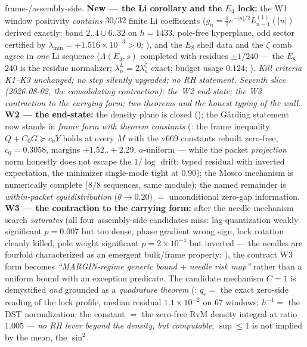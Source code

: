 \documentclass[11pt,a4paper]{article}
\begin{document}
frame-/assembly-side.  \textbf{New --- the Li corollary and the
$E_4$ lock:} the W1 window positivity \emph{contains} $30/32$ finite
Li coefficients ($g_n=\tfrac12e^{-|u|/2}L^{(1)}_{n-1}(|u|)$ derived
exactly; band $2..4\cup6..32$ on $h=1433$, pole-free hyperplane, odd
sector certified by $\lambda_{\min}=+1.516\times10^{-3}>0$;
), and the $E_8$ shell data and the
$\zeta$ comb agree in \emph{one} Li sequence ($\Lambda(E_4,s)$
completed with residues $\pm1/240$ --- the $E_8$ $240$ is the
residue normalizer; $\lambda_n^L=2\lambda_n^\zeta$ exact; budget
usage $0.124$; ).  \emph{Kill criteria K1--K3
unchanged; no step silently upgraded; no RH statement.}
\emph{Seventh slice (2026-08-02, the consolidating contraction): the
W2 end-state; the W3 contraction to the carrying form; two theorems
and the honest typing of the wall.}  \textbf{W2 --- the end-state:}
the density plane is closed (); the
G\aa rding statement now stands in \emph{frame form with theorem
constants} (: the frame inequality
$Q+C_0G\succeq c_0Y$ holds at every $M$ with the v669 constants
rebuilt zero-free, $c_0=0.3058$, margins $+1.52..+2.29$,
$a$-uniform --- while the packet \emph{projection} norm honestly
does not escape the $1/\log$ drift: typed residual with inverted
expectation, the minimizer single-mode tight at $0.90$); the Mosco
mechanism is numerically complete ($8/8$ sequences, same module);
the named remainder is \emph{within-packet equidistribution}
($\theta\to0.20$) $=$ unconditional zero-gap information.
\textbf{W3 --- the contraction to the carrying form:} after the
needle mechanism search \emph{saturates} (all four assembly-side
candidates miss: lag-quantization weakly significant $p=0.007$ but
too dense, phase gradient wrong sign, lock rotation cleanly killed,
pole weight significant $p=2\times10^{-4}$ but inverted --- the
needles are fourfold characterized as an emergent bulk/frame
property; ), the contract W3 form
becomes \emph{``MARGIN-regime generic bound $+$ needle risk map''}
rather than a uniform bound with an exception predicate.  The
candidate mechanism $C=1$ is demystified \emph{and} grounded as a
\emph{quadrature theorem} (: $q_r=$
the exact zero-side reading of the lock profile, median residual
$1.1\times10^{-2}$ on $67$ windows; $h^{-1}=$ the DST
normalization; the constant $=$ the zero-free RvM density integral
at ratio $1.005$ --- \emph{no RH lever beyond the density, but
computable}; $\sup\le1$ is not implied by the mean, the $\sin^2$
\end{document}

